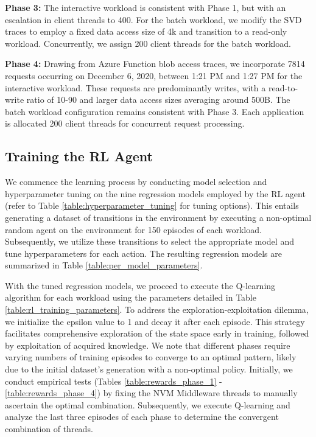 \textbf{Phase 3:} The interactive workload is consistent with Phase 1, but with an escalation in client threads to 400. For the batch workload, we modify the SVD traces to employ a fixed data access size of 4k and transition to a read-only workload. Concurrently, we assign 200 client threads for the batch workload.

\textbf{Phase 4:} Drawing from Azure Function blob access traces, we incorporate 7814 requests occurring on December 6, 2020, between 1:21 PM and 1:27 PM for the interactive workload. These requests are predominantly writes, with a read-to-write ratio of 10-90 and larger data access sizes averaging around 500B. The batch workload configuration remains consistent with Phase 3. Each application is allocated 200 client threads for concurrent request processing.

\subsection*{Training the RL Agent}

We commence the learning process by conducting model selection and hyperparameter tuning on the nine regression models employed by the RL agent (refer to Table \ref{table:hyperparameter_tuning} for tuning options). This entails generating a dataset of transitions in the environment by executing a non-optimal random agent on the environment for 150 episodes of each workload. Subsequently, we utilize these transitions to select the appropriate model and tune hyperparameters for each action. The resulting regression models are summarized in Table \ref{table:per_model_parameters}.

With the tuned regression models, we proceed to execute the Q-learning algorithm for each workload using the parameters detailed in Table \ref{table:rl_training_parameters}. To address the exploration-exploitation dilemma, we initialize the epsilon value to 1 and decay it after each episode. This strategy facilitates comprehensive exploration of the state space early in training, followed by exploitation of acquired knowledge. We note that different phases require varying numbers of training episodes to converge to an optimal pattern, likely due to the initial dataset's generation with a non-optimal policy. Initially, we conduct empirical tests (Tables \ref{table:rewards_phase_1} - \ref{table:rewards_phase_4}) by fixing the NVM Middleware threads to manually ascertain the optimal combination. Subsequently, we execute Q-learning and analyze the last three episodes of each phase to determine the convergent combination of threads.

